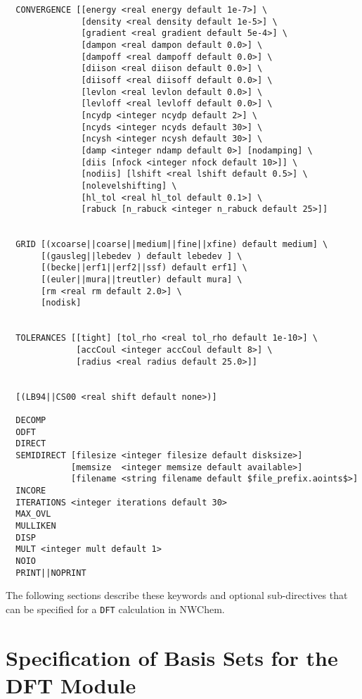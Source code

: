 \begin{verbatim}
  CONVERGENCE [[energy <real energy default 1e-7>] \
               [density <real density default 1e-5>] \
               [gradient <real gradient default 5e-4>] \
               [dampon <real dampon default 0.0>] \
               [dampoff <real dampoff default 0.0>] \
               [diison <real diison default 0.0>] \
               [diisoff <real diisoff default 0.0>] \
               [levlon <real levlon default 0.0>] \
               [levloff <real levloff default 0.0>] \
               [ncydp <integer ncydp default 2>] \
               [ncyds <integer ncyds default 30>] \
               [ncysh <integer ncysh default 30>] \
               [damp <integer ndamp default 0>] [nodamping] \
               [diis [nfock <integer nfock default 10>]] \
               [nodiis] [lshift <real lshift default 0.5>] \
               [nolevelshifting] \
               [hl_tol <real hl_tol default 0.1>] \
               [rabuck [n_rabuck <integer n_rabuck default 25>]]


  GRID [(xcoarse||coarse||medium||fine||xfine) default medium] \
       [(gausleg||lebedev ) default lebedev ] \
       [(becke||erf1||erf2||ssf) default erf1] \
       [(euler||mura||treutler) default mura] \
       [rm <real rm default 2.0>] \
       [nodisk]
        

  TOLERANCES [[tight] [tol_rho <real tol_rho default 1e-10>] \
              [accCoul <integer accCoul default 8>] \
              [radius <real radius default 25.0>]]


  [(LB94||CS00 <real shift default none>)]

  DECOMP
  ODFT
  DIRECT
  SEMIDIRECT [filesize <integer filesize default disksize>]
             [memsize  <integer memsize default available>]
             [filename <string filename default $file_prefix.aoints$>]
  INCORE
  ITERATIONS <integer iterations default 30>
  MAX_OVL
  MULLIKEN
  DISP
  MULT <integer mult default 1>
  NOIO
  PRINT||NOPRINT
\end{verbatim}

The following 
sections describe these keywords and
optional sub-directives that can be specified for a \verb+DFT+ calculation
in NWChem.

\section{Specification of Basis Sets for the DFT Module}

